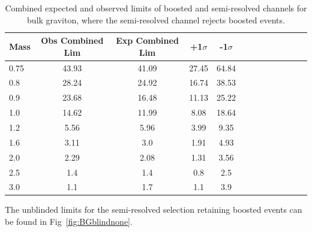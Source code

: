 \begin{table}[h]
\begin{center}
\begin{tabular}{|l|c|c|c|c|c|c|c|c|c|c|c|c|}
\hline
Mass &Obs Combined Lim & Exp Combined Lim & +1$\sigma$ & -1$\sigma$\\ \hline
0.75 & 43.93 & 41.09 & 27.45 & 64.84\\
0.8 & 28.24 & 24.92 & 16.74 & 38.53\\
0.9 & 23.68 & 16.48 & 11.13 & 25.22\\
1.0 & 14.62 & 11.99 & 8.08 & 18.64\\
1.2 & 5.56 & 5.96 & 3.99 & 9.35\\
1.6 & 3.11 & 3.0 & 1.91 & 4.93\\
2.0 & 2.29 & 2.08 & 1.31 & 3.56\\
2.5 & 1.4 & 1.4 & 0.8 &2.5\\
3.0 & 1.1 & 1.7 & 1.1 & 3.9\\
\hline
\end{tabular}
\end{center}
\caption{Combined expected and observed limits of boosted and semi-resolved channels for bulk graviton, where the semi-resolved channel rejects boosted events.}
\label{tab:1p12p1BG}
\end{table}
 
%
%
The unblinded limits for the semi-resolved selection retaining boosted events can be found in Fig~\ref{fig:BGblindnone}.

